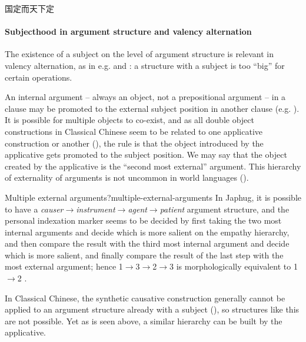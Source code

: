 \documentclass[UTF8, a4paper, oneside, scheme=plain, 12pt]{ctexrep}
\newcommand*{\textto}{$\to$}
\newcommand*{\citepage}[1]{p.~{#1}}
\newcommand*{\term}[1]{\emph{#1}}
\begin{document}
\begin{exe}
    \ex\label{ex:grammatical.clause.subject.passive.1} 国定而天下定
\end{exe}

\paragraph{Subjecthood in argument structure and valency alternation}
\label{sec:grammatical.verbal.subject.argument-structure.alternation}
The existence of a subject on the level of argument structure 
is relevant in valency alternation, as in
e.g. 
and :
a structure with a subject is too ``big'' for certain operations.

An internal argument -- always an object, not a prepositional argument -- in a clause
may be promoted to the external subject position in another clause
(e.g. ).
It is possible for multiple objects to co-exist,
and as all double object constructions in Classical Chinese
seem to be related to one applicative construction or another
(),
the rule is that the object introduced by the applicative gets promoted to the subject position.
We may say that the object created by the applicative is the ``second most external'' argument.
This hierarchy of externality of arguments is not uncommon in world languages
().

\begin{infobox}{Multiple external arguments?}{multiple-external-arguments}
    In Japhug, it is possible to have a \term{causer}\textto\term{instrument}\textto\term{agent}\textto\term{patient} argument structure,
    and the personal indexation marker seems to be decided by first taking the two most internal arguments and decide which is more salient on the empathy hierarchy,
    and then compare the result with the third most internal argument and decide which is more salient,
    and finally compare the result of the last step with the most external argument;
    hence 1\textto 3\textto 2\textto 3 is morphologically equivalent to 1\textto 2
    \citep[\citepage{310};\citepage{584},(116);\citepage{848},(67)]{jacques2021grammar}.
    
    In Classical Chinese, the synthetic causative construction 
    generally cannot be applied to an argument structure already with a subject (),
    so structures like this are not possible.
    Yet as is seen above, a similar hierarchy can be built by the applicative.
\end{infobox}
\end{document}
